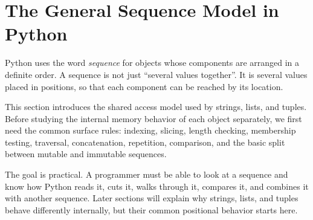 \section{The General Sequence Model in Python}

Python uses the word \emph{sequence} for objects whose components are arranged in a definite order. A sequence is not just ``several values together''. It is several values placed in positions, so that each component can be reached by its location.

This section introduces the shared access model used by strings, lists, and tuples. Before studying the internal memory behavior of each object separately, we first need the common surface rules: indexing, slicing, length checking, membership testing, traversal, concatenation, repetition, comparison, and the basic split between mutable and immutable sequences.

The goal is practical. A programmer must be able to look at a sequence and know how Python reads it, cuts it, walks through it, compares it, and combines it with another sequence. Later sections will explain why strings, lists, and tuples behave differently internally, but their common positional behavior starts here.
